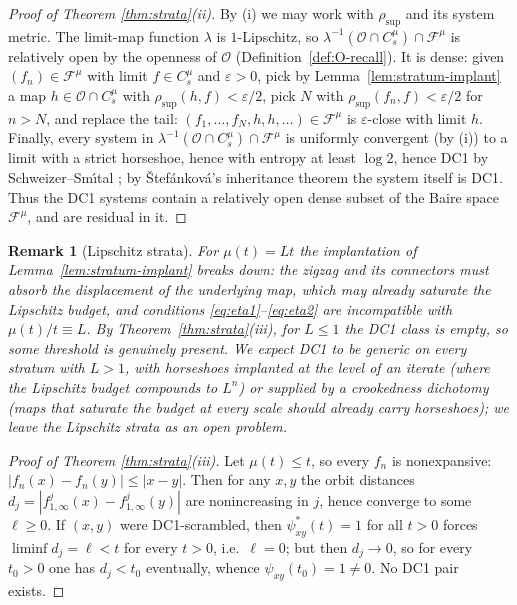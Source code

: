 \documentclass[11pt]{article}
\newtheorem{remark}[theorem]{Remark}
\newcommand{\rsup}{\rho_{\sup}}
\newcommand{\lm}{\lambda}
\begin{document}
\begin{proof}[Proof of Theorem \ref{thm:strata}(ii)]
By (i) we may work with $\rsup$ and its system metric.  The limit-map function
$\lm$ is $1$-Lipschitz, so
$\lm^{-1}(\mathcal O\cap C^\mu_s)\cap\mathcal F^\mu$ is relatively open by the
openness of $\mathcal O$ (Definition~\ref{def:O-recall}).  It is dense: given
$(f_n)\in\mathcal F^\mu$ with limit $f\in C^\mu_s$ and $\varepsilon>0$, pick by
Lemma~\ref{lem:stratum-implant} a map
$h\in\mathcal O\cap C^\mu_s$ with $\rsup(h,f)<\varepsilon/2$, pick $N$ with
$\rsup(f_n,f)<\varepsilon/2$ for $n>N$, and replace the tail:
$(f_1,\dots,f_N,h,h,\dots)\in\mathcal F^\mu$ is $\varepsilon$-close with limit
$h$.  Finally, every system in $\lm^{-1}(\mathcal O\cap C^\mu_s)\cap\mathcal F^\mu$
is uniformly convergent (by (i)) to a limit with a strict horseshoe, hence with
entropy at least $\log2$, hence DC1 by Schweizer--Sm\'\i tal \cite{SS}; by
\v Stef\'ankov\'a's inheritance theorem \cite{Stefankova} the system itself is
DC1.  Thus the DC1 systems contain a relatively open dense subset of the Baire
space $\mathcal F^\mu$, and are residual in it.
\end{proof}

\begin{remark}[Lipschitz strata]\label{rem:lip}
For $\mu(t)=Lt$ the implantation of Lemma~\ref{lem:stratum-implant} breaks down:
the zigzag and its connectors must absorb the displacement of the underlying map,
which may already saturate the Lipschitz budget, and conditions
\eqref{eq:eta1}--\eqref{eq:eta2} are incompatible with $\mu(t)/t\equiv L$.  By
Theorem~\ref{thm:strata}(iii), for $L\le1$ the DC1 class is empty, so some
threshold is genuinely present.  We expect DC1 to be generic on every stratum
with $L>1$, with horseshoes implanted at the level of an iterate (where the
Lipschitz budget compounds to $L^n$) or supplied by a crookedness dichotomy
(maps that saturate the budget at every scale should already carry horseshoes);
we leave the Lipschitz strata as an open problem.
\end{remark}

\begin{proof}[Proof of Theorem \ref{thm:strata}(iii)]
Let $\mu(t)\le t$, so every $f_n$ is nonexpansive:
$|f_n(x)-f_n(y)|\le|x-y|$.  Then for any $x,y$ the orbit distances
$d_j=|f^j_{1,\infty}(x)-f^j_{1,\infty}(y)|$ are nonincreasing in $j$, hence
converge to some $\ell\ge0$.  If $(x,y)$ were DC1-scrambled, then
$\psi^*_{xy}(t)=1$ for all $t>0$ forces $\liminf d_j=\ell<t$ for every $t>0$,
i.e.\ $\ell=0$; but then $d_j\to0$, so for every $t_0>0$ one has $d_j<t_0$
eventually, whence $\psi_{xy}(t_0)=1\ne0$.  No DC1 pair exists.
\end{proof}
\end{document}
